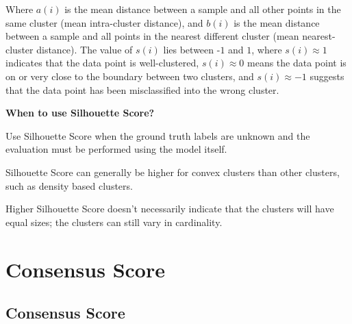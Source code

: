 \begin{center}
\end{center}

Where  $a(i)$ is the mean distance between a sample and all other points in the same cluster (mean intra-cluster distance), 
and  $b(i)$ is the mean distance between a sample and all points in the nearest different cluster (mean nearest-cluster distance). 
The value of  $s(i)$ lies between -$1$ and  $1$, where  $s(i) \approx 1$ indicates that the data point is well-clustered, 
 $s(i) \approx 0$ means the data point is on or very close to the boundary between two clusters, and  $s(i) \approx -1$ 
suggests that the data point has been misclassified into the wrong cluster.

\textbf{When to use Silhouette Score?}

Use Silhouette Score when the ground truth labels are unknown and the evaluation must be performed using the model itself.

{
\item Silhouette Score can generally be higher for convex clusters than other clusters, such as density based clusters.
\item Higher Silhouette Score doesn't necessarily indicate that the clusters will have equal sizes; the clusters can still vary in cardinality. 
}

\clearpage
\thispagestyle{clusteringstyle}
\section{ Consensus Score}
\subsection{ Consensus Score}